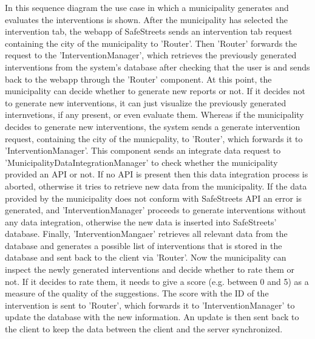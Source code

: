 In this sequence diagram the use case in which a municipality generates and evaluates the interventions is shown. After the municipality has selected the intervention tab, the webapp of SafeStreets sends an intervention tab request containing the city of the municipality to 'Router'. Then 'Router' forwards the request to the 'InterventionManager', which retrieves the previously generated interventions from the system's database after checking that the user is  and sends back to the webapp through the 'Router' component. At this point, the municipality can decide whether to generate new reports or not. If it decides not to generate new interventions, it can just visualize the previously generated internvetions, if any present, or even evaluate them. Whereas if the municipality decides to generate new interventions, the system sends a generate intervention request, containing the city of the municpality, to 'Router', which forwards it to 'InterventionManager'. This component sends an integrate data request to 'MunicipalityDataIntegrationManager' to check whether the municipality provided an API or not. If no API is present then this data integration process is aborted, otherwise it tries to retrieve new data from the municipality. If the data provided by the municipality does not conform with SafeStreets API an error is generated, and 'InterventionManager' proceeds to generate interventions without any data integration, otherwise the new data is inserted into SafeStreets' database. Finally, 'InterventionMangaer' retrieves all relevant data from the database and generates a possible list of interventions that is stored in the database and sent back to the client via 'Router'. Now the municipality can inspect the newly generated interventions and decide whether to rate them or not. If it decides to rate them, it needs to give a score (e.g. between 0 and 5) as a measure of the quality of the suggestions. The score with the ID of the intervention is sent to 'Router', which forwards it to 'InterventionManager' to update the database with the new information. An update is then sent back to the client to keep the data between the client and the server synchronized.	